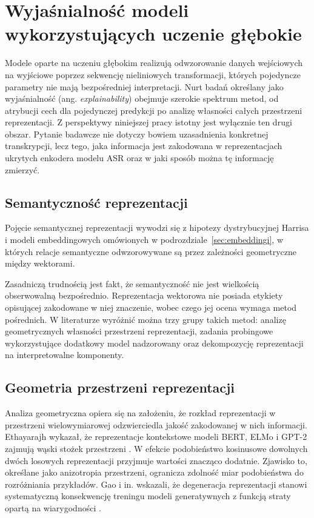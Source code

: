 \section{Wyjaśnialność modeli wykorzystujących uczenie głębokie}

Modele oparte na uczeniu głębokim realizują odwzorowanie danych wejściowych na wyjściowe poprzez sekwencję nieliniowych transformacji, których pojedyncze parametry nie mają bezpośredniej interpretacji. Nurt badań określany jako wyjaśnialność (ang. \textit{explainability}) obejmuje szerokie spektrum metod, od atrybucji cech dla pojedynczej predykcji po analizę własności całych przestrzeni reprezentacji. Z perspektywy niniejszej pracy istotny jest wyłącznie ten drugi obszar. Pytanie badawcze nie dotyczy bowiem uzasadnienia konkretnej transkrypcji, lecz tego, jaka informacja jest zakodowana w reprezentacjach ukrytych enkodera modelu ASR oraz w jaki sposób można tę informację zmierzyć.

\subsection{Semantyczność reprezentacji}

Pojęcie semantycznej reprezentacji wywodzi się z hipotezy dystrybucyjnej Harrisa i modeli embeddingowych omówionych w podrozdziale~\ref{sec:embeddingi}, w których relacje semantyczne odwzorowywane są przez zależności geometryczne między wektorami.

Zasadniczą trudnością jest fakt, że semantyczność nie jest wielkością obserwowalną bezpośrednio. Reprezentacja wektorowa nie posiada etykiety opisującej zakodowane w niej znaczenie, wobec czego jej ocena wymaga metod pośrednich. W literaturze wyróżnić można trzy grupy takich metod: analizę geometrycznych własności przestrzeni reprezentacji, zadania probingowe wykorzystujące dodatkowy model nadzorowany oraz dekompozycję reprezentacji na interpretowalne komponenty.

\subsection{Geometria przestrzeni reprezentacji}

Analiza geometryczna opiera się na założeniu, że rozkład reprezentacji w przestrzeni wielowymiarowej odzwierciedla jakość zakodowanej w nich informacji. Ethayarajh wykazał, że reprezentacje kontekstowe modeli BERT, ELMo i GPT-2 zajmują wąski stożek przestrzeni \cite{cone}. W efekcie podobieństwo kosinusowe dowolnych dwóch losowych reprezentacji przyjmuje wartości znacząco dodatnie. Zjawisko to, określane jako anizotropia przestrzeni, ogranicza zdolność miar podobieństwa do rozróżniania przykładów. Gao i in. wskazali, że degeneracja reprezentacji stanowi systematyczną konsekwencję treningu modeli generatywnych z funkcją straty opartą na wiarygodności \cite{gao2019representation}.

